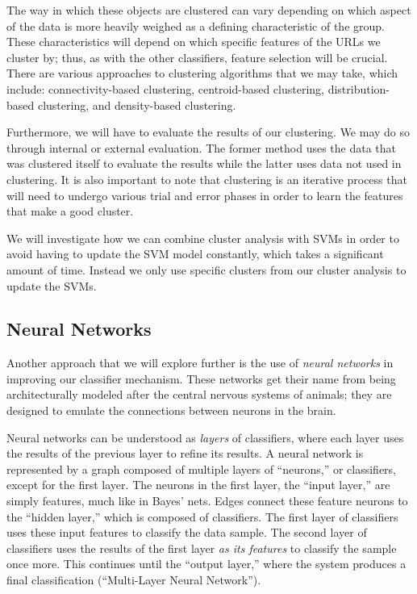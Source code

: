 \documentclass[cs,proposal]{hmcclinic}
\begin{document}
The way in which these objects are clustered can vary depending on which aspect of the data is more heavily weighed as a defining characteristic of the group. These characteristics will depend on which specific features of the URLs we cluster by; thus, as with the other classifiers, feature selection will be crucial. There are various approaches to clustering algorithms that we may take, which include: connectivity-based clustering, centroid-based clustering, distribution-based clustering, and density-based clustering. 

Furthermore, we will have to evaluate the results of our clustering. We may do so through internal or external evaluation. The former method uses the data that was clustered itself to evaluate the results while the latter uses data not used in clustering. It is also important to note that clustering is an iterative process that will need to undergo various trial and error phases in order to learn the features that make a good cluster.

We will investigate how we can combine cluster analysis with SVMs in order to avoid having to update the SVM model constantly, which takes a significant amount of time. Instead we only use specific clusters from our cluster analysis to update the SVMs.

\subsection{Neural Networks}

Another approach that we will explore further is the use of \textit{neural networks} in improving our classifier mechanism. These networks get their name from being architecturally modeled after the central nervous systems of animals; they are designed to emulate the connections between neurons in the brain.

Neural networks can be understood as \textit{layers} of classifiers, where each layer uses the results of the previous layer to refine its results. A neural network is represented by a graph composed of multiple layers of ``neurons,'' or classifiers, except for the first layer. The neurons in the first layer, the ``input layer,'' are simply features, much like in Bayes' nets. Edges connect these feature neurons to the ``hidden layer,'' which is composed of classifiers. The first layer of classifiers uses these input features to classify the data sample. The second layer of classifiers uses the results of the first layer \textit{as its features} to classify the sample once more. This continues until the ``output layer,'' where the system produces a final classification (``Multi-Layer Neural Network'').
\end{document}
